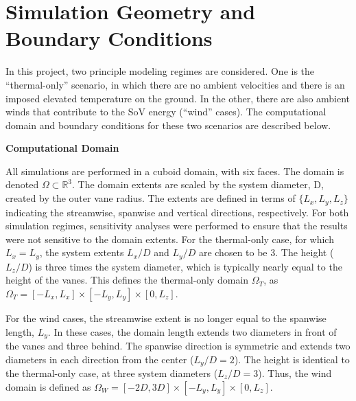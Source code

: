 
\section{Simulation Geometry and Boundary Conditions}
\label{sec:bc}

In this project, two principle modeling regimes are considered. 
One is the ``thermal-only'' scenario, in which there are no ambient
velocities and there is an imposed elevated temperature on the ground.  
In the other, there are also ambient winds that contribute to the SoV energy
(``wind'' cases). 
The computational domain and boundary conditions for these 
two scenarios are described below.

\textbf{Computational Domain} 

All simulations are performed in a cuboid domain, with six
faces.  The domain is denoted $\Omega \subset \mathbb{R}^3$. 
The domain extents are scaled by the system diameter, D, created by the
outer vane radius. The extents are defined in terms of $\{L_x,L_y,L_z\}$ indicating the 
streamwise, spanwise and vertical directions, respectively. 
For both simulation regimes, sensitivity analyses 
were performed to ensure that the results were not sensitive 
to the domain extents. For the thermal-only case, for which $L_x = L_y$,
the system 
extents $L_x/D$ and $L_y/D$ are chosen to be 3. The height ($L_z/D$) is
three times the system diameter, which is typically nearly equal to the
height of the vanes. This defines the thermal-only domain $\Omega_T$, 
as $\Omega_T = \left[-L_x,L_x \right] \times \left[-L_y,L_y \right]
\times \left[0,L_z \right]$.   

For the wind cases, the streamwise extent is no longer equal to
the spanwise length, $L_y$. In these cases, the domain length extends
two diameters in front of the vanes and three behind. The
spanwise direction is symmetric and extends two diameters in each direction 
from the center ($L_y/D = 2$). The height is identical to the
thermal-only case, at three system diameters ($L_z/D = 3$). Thus, the
wind domain is defined as $\Omega_W = \left[-2D,3D \right] \times
\left[-L_y,L_y \right] \times \left[0,L_z \right]$.   

